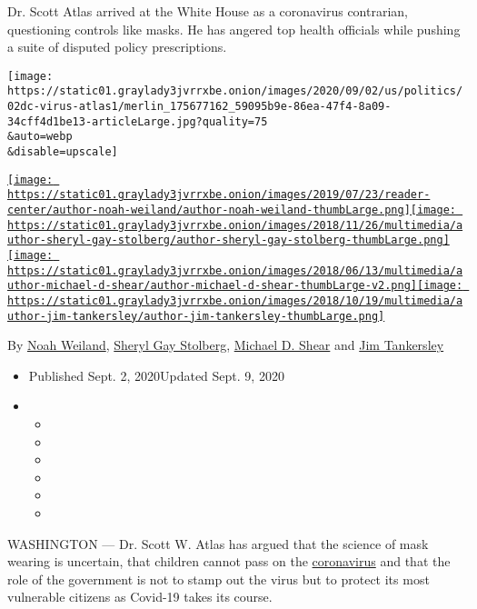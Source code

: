Dr. Scott Atlas arrived at the White House as a coronavirus contrarian,
questioning controls like masks. He has angered top health officials
while pushing a suite of disputed policy prescriptions.

\texttt{[image: https://static01.graylady3jvrrxbe.onion/images/2020/09/02/us/politics/02dc-virus-atlas1/merlin\_175677162\_59095b9e-86ea-47f4-8a09-34cff4d1be13-articleLarge.jpg?quality=75\\\&auto=webp\\\&disable=upscale]}

\href{https://www.nytimes3xbfgragh.onion/by/noah-weiland}{\texttt{[image: https://static01.graylady3jvrrxbe.onion/images/2019/07/23/reader-center/author-noah-weiland/author-noah-weiland-thumbLarge.png]}}\href{https://www.nytimes3xbfgragh.onion/by/sheryl-gay-stolberg}{\texttt{[image: https://static01.graylady3jvrrxbe.onion/images/2018/11/26/multimedia/author-sheryl-gay-stolberg/author-sheryl-gay-stolberg-thumbLarge.png]}}\href{https://www.nytimes3xbfgragh.onion/by/michael-d-shear}{\texttt{[image: https://static01.graylady3jvrrxbe.onion/images/2018/06/13/multimedia/author-michael-d-shear/author-michael-d-shear-thumbLarge-v2.png]}}\href{https://www.nytimes3xbfgragh.onion/by/jim-tankersley}{\texttt{[image: https://static01.graylady3jvrrxbe.onion/images/2018/10/19/multimedia/author-jim-tankersley/author-jim-tankersley-thumbLarge.png]}}

By \href{https://www.nytimes3xbfgragh.onion/by/noah-weiland}{Noah
Weiland},
\href{https://www.nytimes3xbfgragh.onion/by/sheryl-gay-stolberg}{Sheryl
Gay Stolberg},
\href{https://www.nytimes3xbfgragh.onion/by/michael-d-shear}{Michael D.
Shear} and
\href{https://www.nytimes3xbfgragh.onion/by/jim-tankersley}{Jim
Tankersley}

\begin{itemize}
\item
  Published Sept. 2, 2020Updated Sept. 9, 2020
\item
  \begin{itemize}
  \item
  \item
  \item
  \item
  \item
  \item
  \end{itemize}
\end{itemize}

WASHINGTON --- Dr. Scott W. Atlas has argued that the science of mask
wearing is uncertain, that children cannot pass on the
\href{https://www.nytimes3xbfgragh.onion/2020/09/09/us/politics/woodward-trump-book-virus.html}{coronavirus}
and that the role of the government is not to stamp out the virus but to
protect its most vulnerable citizens as Covid-19 takes its course.

